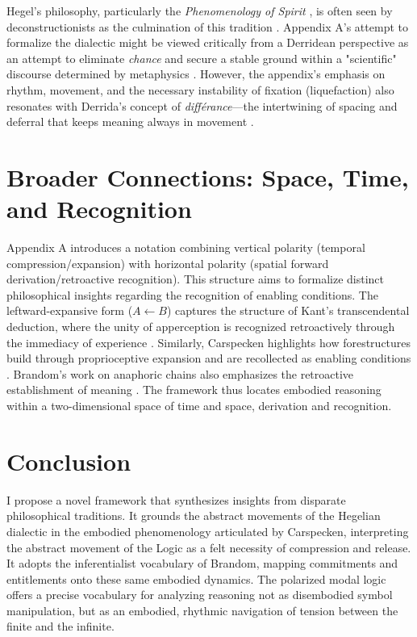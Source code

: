 \documentclass[12pt]{book}
\begin{document}
Hegel's philosophy, particularly the \textit{Phenomenology of Spirit} \parencite{hegel1977phenomenology}, is often seen by deconstructionists as the culmination of this tradition \parencite{Derrida:1973, agamben_language_2006}. Appendix A's attempt to formalize the dialectic might be viewed critically from a Derridean perspective as an attempt to eliminate \textit{chance} and secure a stable ground within a "scientific" discourse determined by metaphysics \parencite{Lucy2004Derrida}. However, the appendix's emphasis on rhythm, movement, and the necessary instability of fixation (liquefaction) also resonates with Derrida's concept of \textit{différance}—the intertwining of spacing and deferral that keeps meaning always in movement \parencite{Derrida:1973}.

\section{Broader Connections: Space, Time, and Recognition}

Appendix A introduces a notation combining vertical polarity (temporal compression/expansion) with horizontal polarity (spatial forward derivation/retroactive recognition). This structure aims to formalize distinct philosophical insights regarding the recognition of enabling conditions. The leftward-expansive form ($A \leftarrow B$) captures the structure of Kant's transcendental deduction, where the unity of apperception is recognized retroactively through the immediacy of experience \parencite{caygill_kant_2004}. Similarly, Carspecken highlights how forestructures build through proprioceptive expansion and are recollected as enabling conditions \parencite{Carspecken1999}. Brandom's work on anaphoric chains also emphasizes the retroactive establishment of meaning \parencite{brandom1994making}. The framework thus locates embodied reasoning within a two-dimensional space of time and space, derivation and recognition.

\section{Conclusion}

I propose a novel framework that synthesizes insights from disparate philosophical traditions. It grounds the abstract movements of the Hegelian dialectic in the embodied phenomenology articulated by Carspecken, interpreting the abstract movement of the Logic as a felt necessity of compression and release. It adopts the inferentialist vocabulary of Brandom, mapping commitments and entitlements onto these same embodied dynamics. The polarized modal logic offers a precise vocabulary for analyzing reasoning not as disembodied symbol manipulation, but as an embodied, rhythmic navigation of tension between the finite and the infinite.
\end{document}
